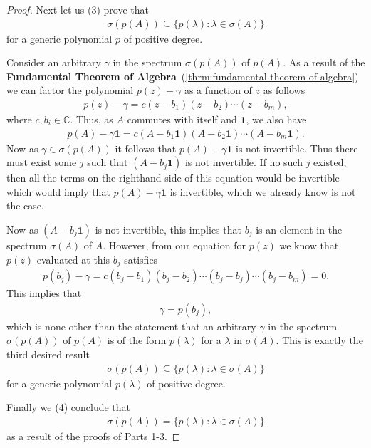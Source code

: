 \begin{proof}
Next let us (3) prove that
\begin{align}
    \sigma(p(A)) \subseteq \{ p(\lambda) : \lambda \in \sigma(A) \}
\end{align}
for a generic polynomial $p$ of positive degree.

Consider an arbitrary $\gamma$ in the spectrum $\sigma(p(A))$ of $p(A)$. As a result of the \textbf{Fundamental Theorem of Algebra}~(\ref{thrm:fundamental-theorem-of-algebra}) we can factor the polynomial $p(z) - \gamma$ as a function of $z$ as follows
\begin{align}
    p(z) - \gamma = c (z - b_1)(z - b_2)\cdots(z - b_m),
\end{align}
where $c, b_i\in \mathbb{C}$. Thus, as $A$ commutes with itself and $\mathbf{1}$, we also have
\begin{align}
    p(A) - \gamma \mathbf{1} = c (A - b_1 \mathbf{1} )(A - b_2 \mathbf{1} )\cdots(A - b_m \mathbf{1} ).
\end{align}
Now as $\gamma \in \sigma(p(A))$ it follows that $p(A) - \gamma \mathbf{1}$ is not invertible. Thus there must exist some $j$ such that $(A - b_j \mathbf{1})$ is not invertible. If no such $j$ existed, then all the terms on the righthand side of this equation would be invertible which would imply that $p(A) - \gamma \mathbf{1}$ is invertible, which we already know is not the case.

Now as $(A - b_j \mathbf{1})$ is not invertible, this implies that $b_j$ is an element in the spectrum $\sigma(A)$ of $A$. However, from our equation for $p(z)$ we know that $p(z)$ evaluated at this $b_j$ satisfies
\begin{align}
    p(b_j) - \gamma = c (b_j - b_1)(b_j - b_2)\cdots(b_j -  b_j)\cdots(b_j - b_m) = 0.
\end{align}
This implies that
\begin{align}
    \gamma = p(b_j),
\end{align}
which is none other than the statement that an arbitrary $\gamma$ in the spectrum $\sigma(p(A))$ of $p(A)$ is of the form $p(\lambda)$ for a $\lambda$ in $\sigma(A)$. This is exactly the third desired result
\begin{align}
    \sigma(p(A)) \subseteq \{ p(\lambda) : \lambda \in \sigma(A) \}
\end{align}
for a generic polynomial $p(\lambda)$ of positive degree.

Finally we (4) conclude that
\begin{align}
    \sigma(p(A)) = \{ p(\lambda) : \lambda \in \sigma(A) \}
\end{align}
as a result of the proofs of Parts 1-3.


\end{proof}
